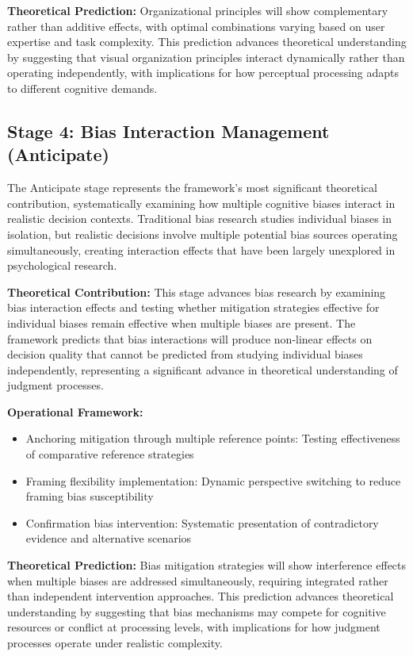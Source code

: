 \documentclass[
  authoryear,
  preprint]{elsarticle}
\providecommand{\tightlist}{%
  \setlength{\itemsep}{0pt}\setlength{\parskip}{0pt}}
\begin{document}
\textbf{Theoretical Prediction:} Organizational principles will show
complementary rather than additive effects, with optimal combinations
varying based on user expertise and task complexity. This prediction
advances theoretical understanding by suggesting that visual
organization principles interact dynamically rather than operating
independently, with implications for how perceptual processing adapts to
different cognitive demands.

\subsection{Stage 4: Bias Interaction Management
(Anticipate)}\label{stage-4-bias-interaction-management-anticipate}

The Anticipate stage represents the framework's most significant
theoretical contribution, systematically examining how multiple
cognitive biases interact in realistic decision contexts. Traditional
bias research studies individual biases in isolation, but realistic
decisions involve multiple potential bias sources operating
simultaneously, creating interaction effects that have been largely
unexplored in psychological research.

\textbf{Theoretical Contribution:} This stage advances bias research by
examining bias interaction effects and testing whether mitigation
strategies effective for individual biases remain effective when
multiple biases are present. The framework predicts that bias
interactions will produce non-linear effects on decision quality that
cannot be predicted from studying individual biases independently,
representing a significant advance in theoretical understanding of
judgment processes.

\textbf{Operational Framework:}

\begin{itemize}
\tightlist
\item
  Anchoring mitigation through multiple reference points: Testing
  effectiveness of comparative reference strategies
\item
  Framing flexibility implementation: Dynamic perspective switching to
  reduce framing bias susceptibility
\item
  Confirmation bias intervention: Systematic presentation of
  contradictory evidence and alternative scenarios
\end{itemize}

\textbf{Theoretical Prediction:} Bias mitigation strategies will show
interference effects when multiple biases are addressed simultaneously,
requiring integrated rather than independent intervention approaches.
This prediction advances theoretical understanding by suggesting that
bias mechanisms may compete for cognitive resources or conflict at
processing levels, with implications for how judgment processes operate
under realistic complexity.
\end{document}
